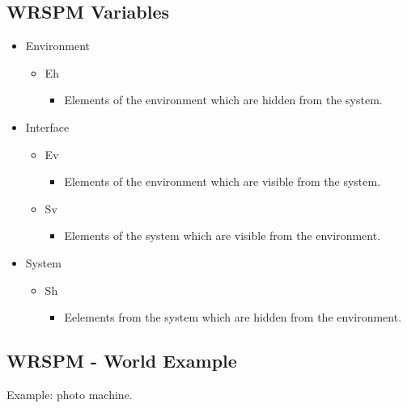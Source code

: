    \subsection{WRSPM Variables}

        \begin{itemize}
            \item Environment
            \begin{itemize}
                \item Eh
                \begin{itemize}
                    \item Elements of the environment which are hidden from the system.
                \end{itemize}
            \end{itemize}
            \item Interface
            \begin{itemize}
                \item Ev
                \begin{itemize}
                    \item Elements of the environment which are visible from the system.
                \end{itemize}
                \item Sv
                \begin{itemize}
                    \item Elements of the system which are visible from the environment.
                \end{itemize}
            \end{itemize}
            \item System
            \begin{itemize}
                \item Sh
                \begin{itemize}
                    \item Eelements from the system which are hidden from the environment.
                \end{itemize}
            \end{itemize}
        \end{itemize}

    \subsection{WRSPM - World Example}

        Example: photo machine.

